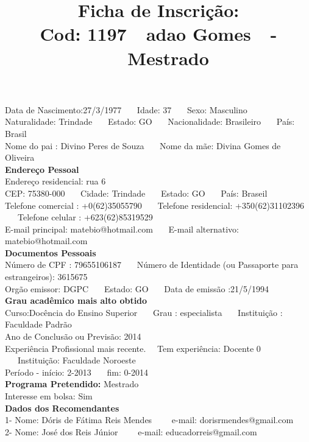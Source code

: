 \documentclass[11pt]{article}
\title{\vspace*{-4cm} Ficha de Inscrição: \\Cod: 1197\ \ adao Gomes\ \ - \ \ Mestrado 
 }
\date{}
\begin{document}
\maketitle
\vspace*{-1.5cm}
\noindent Data de Nascimento:27/3/1977
\ \ \ Idade: 37   \ \ \ Sexo: Masculino
\\
Naturalidade: Trindade  
\ \ \  Estado: GO
\ \ \  Nacionalidade: Brasileiro
\ \ \ País: Brasil
\\        
Nome do pai : Divino Peres de Souza
\ \ \ Nome da mãe: Divina Gomes de Oliveira          
\\[0.2cm]                     
\textbf{Endereço Pessoal} 
\\ 
\noindent Endereço residencial: rua 6
\\
        CEP: 75380-000 
\ \ \ Cidade: Trindade 
\ \ \ Estado: GO 
\ \ \ País: Braseil
\\		
		Telefone comercial : +0(62)35055790
\ \ \ Telefone residencial: +350(62)31102396
\ \ \ Telefone celular : +623(62)85319529
\\
E-mail principal: matebio@hotmail.com
\ \ \ E-mail alternativo: matebio@hotmail.com 
\\[0.2cm] 
\textbf{Documentos Pessoais}
\\
\noindent Número de CPF : 79655106187
\ \ \ Número de Identidade (ou Passaporte para estrangeiros): 3615675
\\
Orgão emissor: DGPC
\ \ \ Estado: GO
\ \ \ Data de emissão :21/5/1994
\\[0.3cm]
\textbf{Grau acadêmico mais alto obtido}
\\	
Curso:Docência do Ensino Superior
\ \ \ Grau : especialista
\ \ \ Instituição : Faculdade Padrão
\\			
Ano de Conclusão ou Previsão: 2014
\\ 
Experiência Profissional mais recente. \ \  
Tem experiência: Docente 0  
\ \ \ Instituição: Faculdade Noroeste
\\  
Período - início: 2-2013
\ \ \ fim: 0-2014
\\[0.2cm] 
\textbf{Programa Pretendido:} Mestrado\\
Interesse em bolsa: Sim
\\[0.3cm]		
\textbf{Dados dos Recomendantes} 
\\
1- Nome: Dóris de Fátima Reis Mendes
\ \ \ \  e-mail: dorisrmendes@gmail.com 
\\
2- Nome: José dos Reis Júnior
\ \ \ \ e-mail: educadorreis@gmail.com
\\
\end{document}
